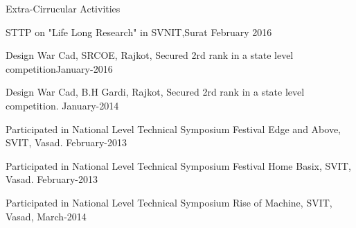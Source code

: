 \documentclass{resume} %
\begin{document}
\begin{rSection}{Extra-Cirrucular Activities} \itemsep -1pt {}   
\item STTP on "Life Long Research" in SVNIT,Surat \hfill February 2016
\item Design War Cad, SRCOE, Rajkot, Secured 2rd rank in a state level competition\hfill January-2016
\item  Design War Cad, B.H Gardi, Rajkot, Secured 2rd rank in a
state level competition. \hfill January-2014 
\item Participated in National Level Technical Symposium Festival Edge and Above, SVIT, Vasad. \hfill February-2013
\item Participated in National Level Technical Symposium Festival Home Basix, SVIT, Vasad.
 \hfill  February-2013 
\item Participated in National Level Technical Symposium Rise of Machine, SVIT, Vasad,  \hfill March-2014 
 

\end{rSection}
\end{document}
